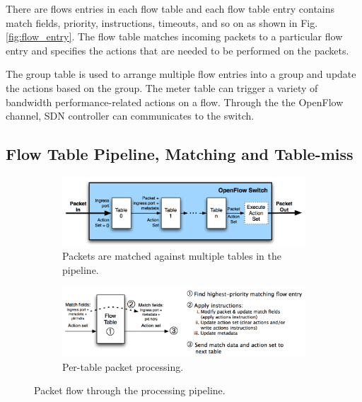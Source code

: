 There are flows entries in each flow table and each flow table entry contains match fields, priority, instructions, timeouts, and so on as shown in Fig. \ref{fig:flow_entry}.
The flow table matches incoming packets to a particular flow entry and specifies the actions that are needed to be performed on the packets.


The group table is used to arrange multiple flow entries into a group and update the actions based on the group. The meter table can trigger a variety of bandwidth performance-related actions on a flow. Through the the OpenFlow channel, SDN controller can communicates to the switch.



\subsection{Flow Table Pipeline, Matching and Table-miss}

\begin{figure}[!ht]
  \begin{subfigure}[b]{\textwidth}
    \includegraphics[width=\textwidth]{./fig/openflow_pipeline}
    \caption{Packets are matched against multiple tables in the pipeline.}
    \label{fig:openflow_pipeline2}
  \end{subfigure}
  \hfill
  \begin{subfigure}[b]{\textwidth}
    \includegraphics[width=\textwidth]{./fig/openflow_pipeline2}
    \caption{Per-table packet processing.}
    \label{fig:openflow_pipeline3}
  \end{subfigure}
  \caption{Packet flow through the processing pipeline. \cite{openflow-spec}}
  \label{fig:openflow_pipeline}
\end{figure}


